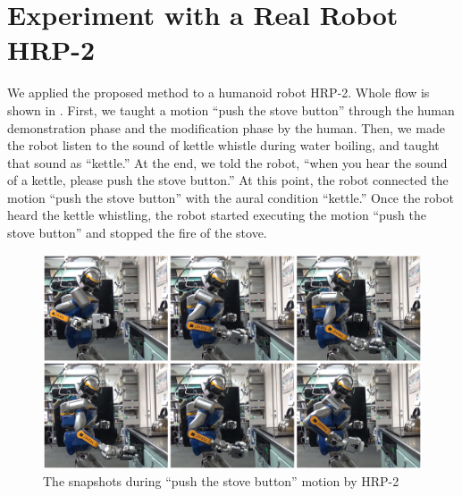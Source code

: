 \section{Experiment with a Real Robot HRP-2}
We applied the proposed method to a humanoid robot HRP-2. Whole flow is shown in . First, we taught a motion ``push the stove button'' through the human demonstration phase and the modification phase by the human. Then, we made the robot listen to the sound of kettle whistle during water boiling, and taught that sound as ``kettle.'' At the end, we told the robot, ``when you hear the sound of a kettle, please push the stove button.'' At this point, the robot connected the motion ``push the stove button'' with the aural condition ``kettle.'' Once the robot heard the kettle whistling, the robot started executing the motion ``push the stove button'' and stopped the fire of the stove.


\vspace{-3mm}
\begin{figure}[htbp]
 \begin{center}
  \includegraphics[width=0.80\columnwidth]{figs/push_button}
  \caption{\small{The snapshots during ``push the stove button'' motion by HRP-2}}
  \label{figure:experiment}
 \end{center}
 \vspace{-5mm}
\end{figure}
